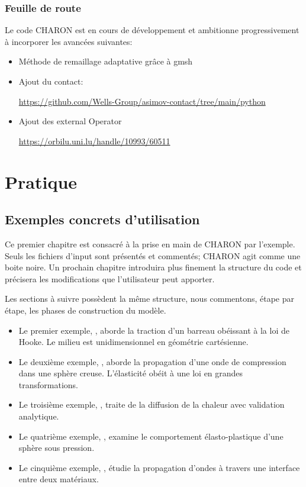 \documentclass[10pt]{book}
\begin{document}
\section*{Feuille de route}
Le code CHARON est en cours de développement et ambitionne progressivement à incorporer les avancées suivantes:
\begin{itemize}
\item Méthode de remaillage adaptative grâce à gmsh
\item Ajout du contact:
\begin{center}
\url{https://github.com/Wells-Group/asimov-contact/tree/main/python}
\end{center}
\item Ajout des external Operator
\begin{center}
\url{https://orbilu.uni.lu/handle/10993/60511}
\end{center}
\end{itemize}
\part{Pratique}\label{Part:Pratique}
\chapter{Exemples concrets d'utilisation}\label{Chapitre:Exemples concrets}
Ce premier chapitre est consacré à la prise en main de CHARON par l'exemple. Seuls les fichiers d'input sont présentés et commentés; CHARON agit comme une boite noire. Un prochain chapitre introduira plus finement la structure du code et précisera les modifications que l'utilisateur peut apporter.

Les sections à suivre possèdent la même structure, nous commentons, étape par étape, les phases de construction du modèle.

\begin{itemize}[label = $\star$]
\item Le premier exemple, , aborde la traction d'un barreau obéissant à la loi de Hooke. Le milieu est unidimensionnel en géométrie cartésienne.
\item Le deuxième exemple, , aborde la propagation d'une onde de compression dans une sphère creuse. L'élasticité obéit à une loi en grandes transformations.
\item Le troisième exemple, , traite de la diffusion de la chaleur avec validation analytique.
\item Le quatrième exemple, , examine le comportement élasto-plastique d'une sphère sous pression.
\item Le cinquième exemple, , étudie la propagation d'ondes à travers une interface entre deux matériaux.
\end{itemize}
\end{document}
